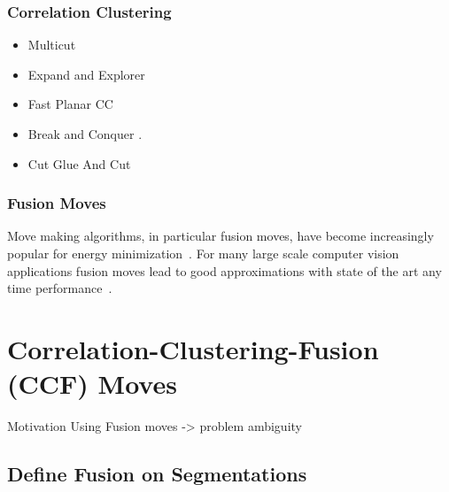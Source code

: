 \documentclass[10pt,twocolumn,letterpaper]{article}
\begin{document}
    

\subsubsection{Correlation Clustering}
   \begin{itemize}
   \item Multicut~\cite{kappes_2011_emmcvpr}
   \item Expand and Explorer~\cite{bagon_2011_arxiv}
   \item Fast Planar CC~\cite{yarkony_2012_eccv}
   \item Break and Conquer \cite{alush_2013_simbad}.
   \item Cut Glue And Cut~\cite{beier_2014_cvpr}
   \end{itemize}

\subsubsection{Fusion Moves}
Move making algorithms, in particular fusion moves, 
have become increasingly popular for energy minimization~\cite{???,kappes_2014_ws}.
For many large scale computer vision applications fusion moves lead to good approximations
with state of the art any time performance~\cite{kappes_2014_ws}.







\section{Correlation-Clustering-Fusion (CCF) Moves}
Motivation Using Fusion moves -> problem ambiguity





\subsection{Define Fusion on Segmentations}

\end{document}
